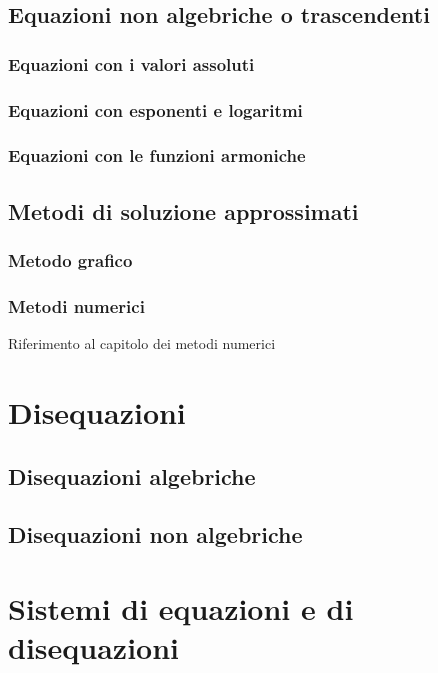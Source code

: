 \section{Equazioni non algebriche o trascendenti}
\subsection{Equazioni con i valori assoluti}
\subsection{Equazioni con esponenti e logaritmi}
\subsection{Equazioni con le funzioni armoniche}

\section{Metodi di soluzione approssimati}
\subsection{Metodo grafico}
\subsection{Metodi numerici}
{\color{red} Riferimento al capitolo dei metodi numerici}

\chapter{Disequazioni}
\section{Disequazioni algebriche}
\section{Disequazioni non algebriche}

\chapter{Sistemi di equazioni e di disequazioni}


